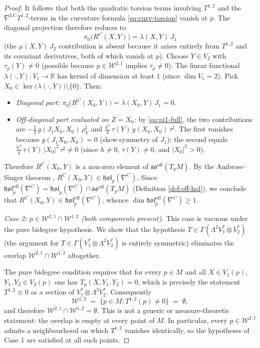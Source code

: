 \documentclass[11pt,reqno]{amsart}
\theoremstyle{plain}
\theoremstyle{definition}
\numberwithin{equation}{section}
\begin{document}
\begin{proof}
It follows that both the quadratic torsion terms involving $T^{1,2}$
and the $\nabla^{\mathrm{LC}}T^{1,2}$-terms in the curvature
formula \eqref{eq:curv-torsion} vanish at $p$.
The diagonal projection therefore reduces to
\[
  \pi_0\bigl(R^C(X,Y)\bigr) = \lambda(X,Y)\,J_1
\]
(the $\mu(X,Y)\,J_2$ contribution is absent because it arises
entirely from $T^{1,2}$ and its covariant derivatives, both of which
vanish at $p$).
Choose $Y\in V_2$ with $\tau_p(Y)\neq 0$ (possible because
$p\in\mathcal{W}^{2,1}$ implies $\tau_p\neq 0$).  The linear
functional $\lambda(\cdot,Y)\colon V_1\to\mathbb{R}$ has kernel of
dimension at least $1$ (since $\dim V_1=2$).  Pick
$X_0\in\ker\bigl(\lambda(\cdot,Y)\bigr)\setminus\{0\}$.  Then:
\begin{itemize}
\item [] \emph{Diagonal part:}
  $\pi_0\bigl(R^C(X_0,Y)\bigr)=\lambda(X_0,Y)\,J_1=0$.
\medskip
\item [] \emph{Off-diagonal part evaluated on $Z=X_0$:}
  by \eqref{eq:pi1-full}, the two contributions are
  $-\tfrac{1}{2}\,g(J_1X_0,X_0)\,\rho_Y^\sharp$ and
  $\tfrac{h^2}{4}\,\tau(Y)\,g(X_0,X_0)\,\tau^\sharp$.
  The first vanishes because $g(J_1X_0,X_0)=0$
  (skew-symmetry of $J_1$); the second equals
  $\tfrac{h^2}{4}\,\tau(Y)\,|X_0|^2\,\tau^\sharp\neq 0$
  (since $h\neq 0$, $\tau(Y)\neq 0$, and $|X_0|^2>0$).
\end{itemize}
Therefore $R^C(X_0, Y)$ is a non-zero element of 
$\mathfrak{so}^{\mathrm{off}}(T_pM)$.  By the Ambrose--Singer 
theorem \cite{A-S (1953)}, $R^C(X_0, Y) \in \mathfrak{hol}_p(\nabla^C)$.  
Since $\mathfrak{hol}^{\mathrm{off}}_p(\nabla^C) 
= \mathfrak{hol}_p(\nabla^C) \cap 
\mathfrak{so}^{\mathrm{off}}(T_pM)$ (Definition \ref{def:off-hol}), we conclude that $R^C(X_0, Y) \in 
\mathfrak{hol}^{\mathrm{off}}_p(\nabla^C)$, whence 
$\dim\mathfrak{hol}^{\mathrm{off}}_p(\nabla^C) \geq 1$.

\medskip

\noindent \textit{Case 2: $p \in \mathcal{W}^{2,1} \cap \mathcal{W}^{1,2}$ (both components present).} This case is vacuous under the pure bidegree hypothesis. We show that the hypothesis
$T\in\Gamma(\Lambda^{2}V_{1}^{*}\otimes V_{2}^{*})$
(the argument for $T\in\Gamma(V_{1}^{*}\otimes\Lambda^{2}V_{2}^{*})$ is
entirely symmetric) eliminates the overlap
$\mathcal{W}^{2,1}\cap\mathcal{W}^{1,2}$ altogether.

The pure bidegree condition requires that for every $p\in M$ and all
$X\in V_{1}(p)$, $Y_{1},Y_{2}\in V_{2}(p)$ one has
$T_{p}(X,Y_{1},Y_{2})=0$,
which is precisely the statement $T^{1,2}\equiv 0$ as a section of
$V_{1}^{*}\otimes\Lambda^{2}V_{2}^{*}$.  Consequently
\[
  \mathcal{W}^{1,2}
  \;=\;\bigl\{p\in M : T^{1,2}(p)\neq 0\bigr\}
  \;=\;\emptyset,
\]
and therefore $\mathcal{W}^{2,1}\cap\mathcal{W}^{1,2}=\emptyset$.
This is not a generic or measure-theoretic statement: the overlap is
empty at every point of $M$. In particular, every
$p\in\mathcal{W}^{2,1}$ admits a neighbourhood on which $T^{1,2}$ vanishes identically, so the hypotheses of Case 1 are satisfied at all such points.


\end{proof}
\end{document}
